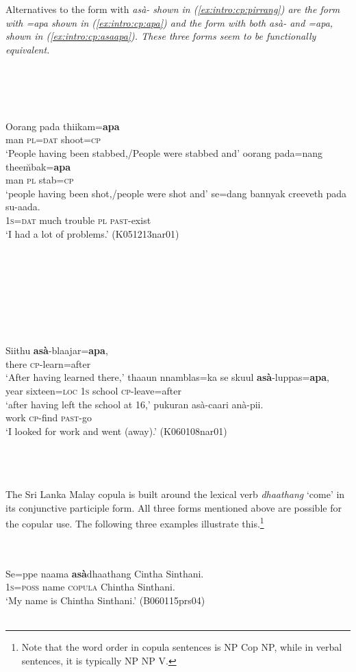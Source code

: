 \documentclass[a4paper,12pt]{article}
\newcommand{\xbox}[2]{\noindent\parbox[t]{#1}{#2}\noindent}
\newcommand{\xref}[1]{(\ref{#1})}
\newcommand{\trs}[2]{{\em #1\em} `#2'}
\newcommand{\ea}{\\\\}
\newcommand{\z}{\\\\}
\begin{document}

Alternatives to the form with \em asà- \em shown in \xref{ex:intro:cp:pirrang} are the form with \em =apa \em shown in \xref{ex:intro:cp:apa} and the form with both \em asà- \em and \em =apa\em, shown in \xref{ex:intro:cp:asaapa}. These three forms seem to be functionally equivalent.

\xbox{\textwidth}{
\ea\label{ex:intro:cp:apa}
\ea
\gll Oorang pada  thiikam=\textbf{apa}\\
man \textsc{pl}=\textsc{dat} shoot=\textsc{cp}\\
`People having been stabbed,/People were stabbed and'
\ex
\gll oorang pada=nang thee\u mbak=\textbf{apa}\\
man \textsc{pl} stab=\textsc{cp}\\
`people having been shot,/people were shot and'
\ex
\gll se=dang bannyak  creeveth pada su-aada. \\
        \textsc{1s=dat} much trouble \textsc{pl} \textsc{past}-exist \\
    `I had a lot of problems.' (K051213nar01)
\z
\z
}

\xbox{\textwidth}{
\ea\label{ex:intro:cp:asaapa}
  \ea 
  \gll Siithu \textbf{asà}-blaajar=\textbf{apa}, \\
  there \textsc{cp}-learn=after\\
  `After having learned there,'
 \ex
  \gll thaaun nnamblas=ka         se   skuul \textbf{asà}-luppas=\textbf{apa}, \\
  year sixteen=\textsc{loc} \textsc{1s} school \textsc{cp}-leave=after\\
  `after having left the school at 16,'
	\ex 
  \gll pukuran asà-caari        anà-pii. \\ %
  work \textsc{cp}-find \textsc{past}-go\\
  `I looked for work and went (away).' (K060108nar01)
  \z
  \z
}
 
The Sri Lanka Malay copula is built around the lexical verb \trs{dhaathang}{come} in its conjunctive participle form. All three forms mentioned above are possible for the copular use. The following three examples illustrate this.\footnote{Note that the word order in copula sentences is NP Cop NP, while in verbal sentences, it is typically NP NP V.}

\xbox{\textwidth}{
\ea\label{ex:intro:copula:asadhaathang}
\gll Se=ppe    naama \textbf{asà}dhaathang  Cintha Sinthani. \\
     \textsc{1s}=\textsc{poss} name \textsc{copula} Chintha Sinthani. \\
    `My name is Chintha Sinthani.' (B060115prs04)
\z
}
\end{document}
